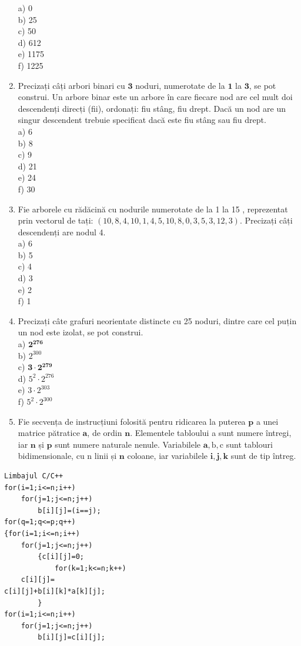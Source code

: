 \documentclass[10pt]{article}
\begin{document}
\begin{enumerate}
a) 0\\
b) 25\\
c) 50\\
d) 612\\
e) 1175\\
f) 1225
  \item Precizați câți arbori binari cu $\mathbf{3}$ noduri, numerotate de la $\mathbf{1}$ la $\mathbf{3}$, se pot construi. Un arbore binar este un arbore în care fiecare nod are cel mult doi descendenți direcți (fii), ordonați: fiu stâng, fiu drept. Dacă un nod are un singur descendent trebuie specificat dacă este fiu stâng sau fiu drept.\\
a) 6\\
b) 8\\
c) 9\\
d) 21\\
e) 24\\
f) 30
  \item Fie arborele cu rădăcină cu nodurile numerotate de la 1 la 15 , reprezentat prin vectorul de tați: $(10,8,4,10,1,4,5,10,8,0,3,5,3,12,3)$. Precizați câți descendenți are nodul 4.\\
a) 6\\
b) 5\\
c) 4\\
d) 3\\
e) 2\\
f) 1
  \item Precizați câte grafuri neorientate distincte cu 25 noduri, dintre care cel puțin un nod este izolat, se pot construi.\\
a) $\mathbf{2}^{\mathbf{2 7 6}}$\\
b) $2^{300}$\\
c) $\mathbf{3} \cdot \mathbf{2}^{\mathbf{2 7 9}}$\\
d) $5^{2} \cdot 2^{276}$\\
e) $3 \cdot 2^{303}$\\
f) $5^{2} \cdot 2^{300}$
  \item Fie secvența de instrucțiuni folosită pentru ridicarea la puterea $\mathbf{p}$ a unei matrice pătratice $\mathbf{a}$, de ordin $\mathbf{n}$. Elementele tabloului a sunt numere întregi, iar $\mathbf{n}$ și $\mathbf{p}$ sunt numere naturale nenule. Variabilele $\mathbf{a}, \mathrm{b}, \mathrm{c}$ sunt tablouri bidimensionale, cu n linii și $\mathbf{n}$ coloane, iar variabilele $\mathbf{i}, \mathbf{j}, \mathbf{k}$ sunt de tip întreg.
\end{enumerate}

\begin{verbatim}
Limbajul C/C++
for(i=1;i<=n;i++)
    for(j=1;j<=n;j++)
        b[i][j]=(i==j);
for(q=1;q<=p;q++)
{for(i=1;i<=n;i++)
    for(j=1;j<=n;j++)
        {c[i][j]=0;
            for(k=1;k<=n;k++)
    c[i][j]=
c[i][j]+b[i][k]*a[k][j];
        }
for(i=1;i<=n;i++)
    for(j=1;j<=n;j++)
        b[i][j]=c[i][j];
\end{verbatim}
\end{document}
